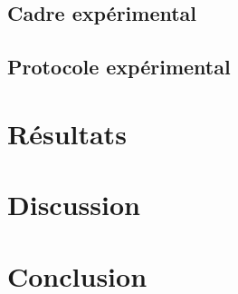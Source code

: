 \documentclass{article}
\begin{document}
\subsection{Cadre expérimental}



\subsection{Protocole expérimental}



\section{Résultats}



\section{Discussion}



\section{Conclusion}




\end{document}
